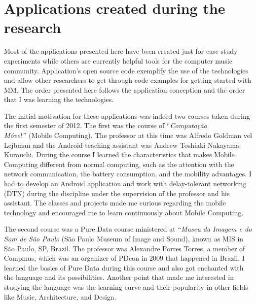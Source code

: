 \chapter{Applications created during the research}
\label{cap:applications}



Most of the applications presented here have been created just for case-study experiments while others are currently helpful tools for the computer music community.
Application's open source code exemplify the use of the technologies and allow other researchers to get through code examples for getting started with MM.
The order presented here follows the application conception and the order that I was learning the technologies.

The initial motivation for these applications was indeed two courses taken during the first semester of 2012.
The first was the course of ``\textit{Computação Móvel''}~(Mobile Computing).
The professor at this time was Alfredo Goldman vel Lejbman and the Android teaching assistant was Andrew Toshiaki Nakayama Kurauchi. %
During the course I learned the characteristics that makes Mobile Computing different from normal computing, such as the attention with the network communication, the battery consumption, and the mobility advantages. %
I had to develop an Android application and work with delay-tolerant networking (DTN) during the discipline under the supervision of the professor and his assistant.
The classes and projects made me curious regarding the mobile technology and encouraged me to learn continuously about Mobile Computing.

The second course was a Pure Data course ministered at ``\textit{Museu da Imagem e do Som de São Paulo} (São Paulo Museum of Image and Sound), known as MIS in São Paulo, SP, Brazil.
The professor was Alexandre Porres Torres, a member of Compmus, which was an organizer of PDcon in 2009 that happened in Brazil.
I learned the basics of Pure Data during this course and also got enchanted with the language and its possibilities.
Another point that made me interested in studying the language was the learning curve and their popularity in other fields like Music, Architecture, and Design.

